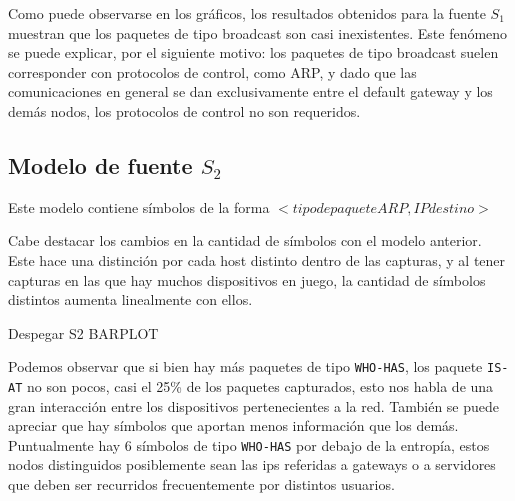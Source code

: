 Como puede observarse en los gráficos, los resultados obtenidos para la fuente $S_1$ muestran que los paquetes de tipo broadcast son casi inexistentes. Este fenómeno se puede explicar, por el siguiente motivo: los paquetes de tipo broadcast suelen corresponder con protocolos de control, como ARP, y dado que las comunicaciones en general se dan exclusivamente entre el default gateway y los demás nodos, los protocolos de control no son requeridos.


\subsection{Modelo de fuente \texorpdfstring{$S_2$}{S2}}

Este modelo contiene símbolos de la forma $< tipo de paquete ARP, IP destino >$

Cabe destacar los cambios en la cantidad de símbolos con el modelo anterior. Este hace una distinción por cada host distinto dentro de las capturas, y al tener capturas en las que hay muchos dispositivos en juego, la cantidad de símbolos distintos aumenta linealmente con ellos.

Despegar S2 BARPLOT

Podemos observar que si bien hay más paquetes de tipo \texttt{WHO-HAS}, los paquete \texttt{IS-AT} no son pocos, casi el 25\% de los paquetes capturados, esto nos habla de una gran interacción entre los dispositivos pertenecientes a la red. También se puede apreciar que hay símbolos que aportan menos información que los demás. Puntualmente hay 6 símbolos de tipo \texttt{WHO-HAS} por debajo de la entropía, estos nodos distinguidos posiblemente sean las ips referidas a gateways o a servidores que deben ser recurridos frecuentemente por distintos usuarios.


